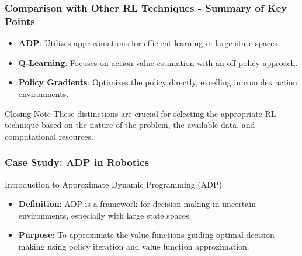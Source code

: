 \documentclass[aspectratio=169]{beamer}
\begin{document}
\begin{frame}[fragile]
    \frametitle{Comparison with Other RL Techniques - Summary of Key Points}
    \begin{itemize}
        \item \textbf{ADP}: Utilizes approximations for efficient learning in large state spaces.
        \item \textbf{Q-Learning}: Focuses on action-value estimation with an off-policy approach.
        \item \textbf{Policy Gradients}: Optimizes the policy directly, excelling in complex action environments.
    \end{itemize}
    \begin{block}{Closing Note}
        These distinctions are crucial for selecting the appropriate RL technique based on the nature of the problem, the available data, and computational resources.
    \end{block}
\end{frame}

\begin{frame}[fragile]
    \frametitle{Case Study: ADP in Robotics}
    \begin{block}{Introduction to Approximate Dynamic Programming (ADP)}
        \begin{itemize}
            \item \textbf{Definition}: ADP is a framework for decision-making in uncertain environments, especially with large state spaces.
            \item \textbf{Purpose}: To approximate the value functions guiding optimal decision-making using policy iteration and value function approximation.
        \end{itemize}
    \end{block}
\end{frame}
\end{document}
